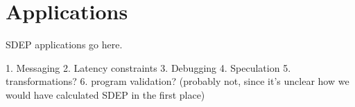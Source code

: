 \section{Applications}

SDEP applications go here.

1. Messaging
2. Latency constraints
3. Debugging
4. Speculation
5. transformations?
6. program validation?  (probably not, since it's unclear how we would have calculated SDEP in the first place)
